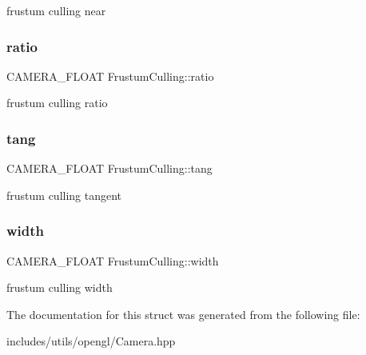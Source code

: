 frustum culling near \mbox{\label{struct_frustum_culling_adb5f141092b327856b422ecd8f8b5f60}} 
\subsubsection{\texorpdfstring{ratio}{ratio}}
{\footnotesize\ttfamily C\+A\+M\+E\+R\+A\+\_\+\+F\+L\+O\+AT Frustum\+Culling\+::ratio}

frustum culling ratio \mbox{\label{struct_frustum_culling_a1589c2a8155b217822c1332f1e7d8f68}} 
\subsubsection{\texorpdfstring{tang}{tang}}
{\footnotesize\ttfamily C\+A\+M\+E\+R\+A\+\_\+\+F\+L\+O\+AT Frustum\+Culling\+::tang}

frustum culling tangent \mbox{\label{struct_frustum_culling_adf36d097760ff9e347789cdf75fde05b}} 
\subsubsection{\texorpdfstring{width}{width}}
{\footnotesize\ttfamily C\+A\+M\+E\+R\+A\+\_\+\+F\+L\+O\+AT Frustum\+Culling\+::width}

frustum culling width 

The documentation for this struct was generated from the following file\+:\begin{DoxyCompactItemize}
\item 
includes/utils/opengl/Camera.\+hpp\end{DoxyCompactItemize}
